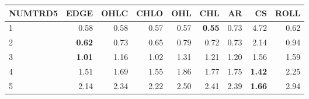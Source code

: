 \begin{table}[ht]
\centering
\begin{tabular}{lrrrrrrrr}
  \hline
NUMTRD5 & EDGE & OHLC & CHLO & OHL & CHL & AR & CS & ROLL \\ 
  \hline
1 & 0.58 & 0.58 & 0.57 & 0.57 & \textbf{0.55} & 0.73 & 4.72 & 0.62 \\ 
  2 & \textbf{0.62} & 0.73 & 0.65 & 0.79 & 0.72 & 0.73 & 2.14 & 0.94 \\ 
  3 & \textbf{1.01} & 1.16 & 1.02 & 1.31 & 1.21 & 1.20 & 1.56 & 1.59 \\ 
  4 & 1.51 & 1.69 & 1.55 & 1.86 & 1.77 & 1.75 & \textbf{1.42} & 2.25 \\ 
  5 & 2.14 & 2.34 & 2.22 & 2.50 & 2.41 & 2.39 & \textbf{1.66} & 2.94 \\ 
   \hline
\end{tabular}
\end{table}
